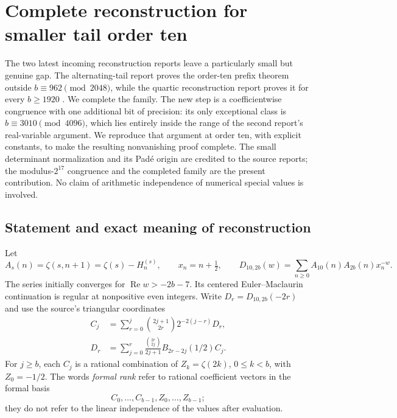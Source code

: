 \section{Complete reconstruction for smaller tail order ten}
\label{ten:section}

The two latest incoming reconstruction reports leave a particularly
small but genuine gap.  The alternating-tail report proves the order-ten
prefix theorem outside $b\equiv962\pmod{2048}$, while the quartic
reconstruction report proves it for every $b\ge1920$
\cite{AlternatingIncoming,QuarticIncoming}.  We complete the family.  The new step is
a coefficientwise congruence with one additional bit of precision:
its only exceptional class is $b\equiv3010\pmod{4096}$, which lies
entirely inside the range of the second report's real-variable argument.
We reproduce that argument at order ten, with explicit constants, to
make the resulting nonvanishing proof complete.  The small determinant
normalization and its Pad\'e origin are credited to the source reports;
the modulus-$2^{17}$ congruence and the completed family are the present
contribution.  No claim of arithmetic independence of numerical special
values is involved.

\subsection{Statement and exact meaning of reconstruction}

Let
\[
 A_s(n)=\zeta(s,n+1)=\zeta(s)-H_n^{(s)},\qquad x_n=n+\tfrac12,
 \qquad
 D_{10,2b}(w)=\sum_{n\ge0}A_{10}(n)A_{2b}(n)x_n^{-w}.
\]
The series initially converges for $\operatorname{Re}w>-2b-7$.
Its centered Euler--Maclaurin continuation is regular at nonpositive
even integers.  Write $D_r=D_{10,2b}(-2r)$ and use the source's
triangular coordinates
\begin{align}
 C_j&=\sum_{r=0}^{j}\binom{2j+1}{2r}2^{-2(j-r)}D_r,
 \label{ten:C}\\
 D_r&=\sum_{j=0}^{r}\frac{\binom{2r}{2j}}{2j+1}
             B_{2r-2j}(1/2)C_j.
 \label{ten:D}
\end{align}
For $j\ge b$, each $C_j$ is a rational combination of
$Z_k=\zeta(2k)$, $0\le k<b$, with $Z_0=-1/2$.  The words
\emph{formal rank} refer to rational coefficient vectors in the
formal basis
\[
 C_0,\ldots,C_{b-1},Z_0,\ldots,Z_{b-1};
\]
they do not refer to the linear independence of the values after
evaluation.

